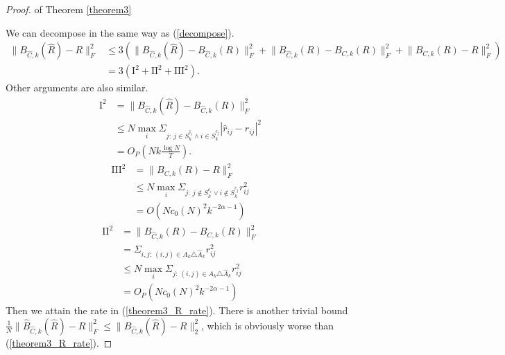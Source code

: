\begin{proof}{ of Theorem \ref{theorem3}}

    We can decompose in the same way as (\ref{decompose}). 
    \begin{equation}
    	\begin{split}
            \lVert B_{\hat{C}, k}(\hat R) - R \rVert_F^2 &\leq 
                3 (\lVert B_{\hat{C}, k}(\hat R) - B_{\hat{C}, k}(R) \rVert_F^2 + 
            	\lVert  B_{\hat{C}, k}(R) - B_{C, k}(R) \rVert_F^2 + 
                \lVert B_{C, k}(R) - R \rVert_F^2 ) \\
            &= 3 (\mathrm{I}^2 + \mathrm{II}^2 + \mathrm{III}^2).
        \end{split} 
        \label{decompose}
    \end{equation}
    Other arguments are also similar.
    \begin{equation}
        \begin{split}
            \mathrm{I}^2 &= \lVert B_{\hat{C}, k}(\hat R) - B_{\hat{C}, k}(R) \rVert_F^2 \\   
            &\leq N \max_i \Sigma_{j:\ j\in S_{k}^{\hat c_i} \land i\in S_{k}^{\hat c_j}} 
                |\hat r_{ij} - r_{ij}|^2 \\
            &= O_P(Nk \frac{\log N}{T}).
        \end{split}
    \end{equation}
    \begin{equation}
        \begin{split}
            \mathrm{III}^2 &= \lVert B_{C,k}(R) - R \rVert_F^2 \\
            &\leq N \max_i 
                \Sigma_{j:\ j \notin S_{k}^{c_i} \lor i \notin S_{k}^{c_j}}  
                r_{ij}^2 \\
            &= O(N c_0(N)^2 k^{-2\alpha-1} )
        \end{split}
    \end{equation} 
    \begin{equation}
        \begin{split}
            \mathrm{II}^2 &= \lVert B_{\hat{C}, k}(R) - B_{C, k}(R)  \rVert_F^2 \\
            &= \Sigma_{i,j:\ (i,j)\in A_k \triangle \hat A_k}  r_{ij}^2 \\
            &\leq N \max_i \Sigma_{j:\ (i,j)\in A_k \triangle \hat A_k}  r_{ij}^2 \\
            &= O_P(N c_0(N)^2 k^{-2\alpha-1} )
        \end{split}
    \end{equation}
    Then we attain the rate in (\ref{theorem3_R_rate}). There is another trivial bound $\frac{1}{N} \lVert \hat B_{\hat C, k}(\hat R) - R \rVert_F^2 \leq \lVert \hat B_{\hat C, k}(\hat R) - R \rVert_2^2$, which is obviously worse than (\ref{theorem3_R_rate}). 
    

\end{proof}
